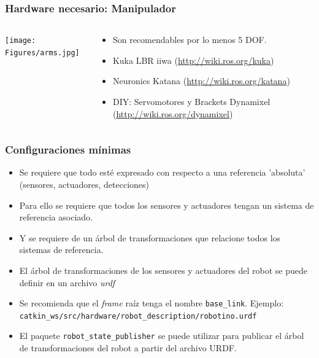 \documentclass[10pt,spanish,aspectratio=1610]{beamer}
\begin{document}
\begin{frame}\frametitle{Hardware necesario: Manipulador}
  \begin{columns}
    \begin{column}{0.4\textwidth}
      \texttt{[image: Figures/arms.jpg]}
    \end{column}
    \begin{column}{0.5\textwidth}
      \begin{itemize}
      \item Son recomendables por lo menos 5 DOF.
      \item Kuka LBR iiwa (\url{http://wiki.ros.org/kuka})
      \item Neuronics Katana (\url{http://wiki.ros.org/katana})
      \item DIY: Servomotores y Brackets Dynamixel (\url{http://wiki.ros.org/dynamixel})
      \end{itemize}
    \end{column}
  \end{columns}
\end{frame}

\begin{frame}\frametitle{Configuraciones mínimas}
  \begin{itemize}
  \item Se requiere que todo esté expresado con respecto a una referencia 'absoluta' (sensores, actuadores, detecciones)
  \item Para ello se requiere que todos los sensores y actuadores tengan un sistema de referencia asociado.
  \item Y se requiere de un árbol de transformaciones que relacione todos los sistemas de referencia.
  \item El árbol de transformaciones de los sensores y actuadores del robot se puede definir en un archivo \textit{urdf}
  \item Se recomienda que el \textit{frame} raíz tenga el nombre \texttt{base\_link}. Ejemplo: \texttt{catkin\_ws/src/hardware/robot\_description/robotino.urdf}
  \item El paquete \texttt{robot\_state\_publisher} se puede utilizar para publicar el árbol de transformaciones del robot a partir del archivo URDF.
  \end{itemize}
\end{frame}
\end{document}
